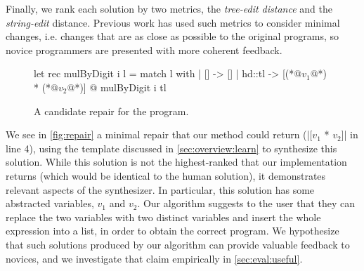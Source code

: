  Finally, we rank each solution by two metrics, the
\emph{tree-edit distance} and the \emph{string-edit} distance. Previous work
\citep{Lerner2007-dt, Wang_2018, Gulwani_2018} has used such metrics to consider
minimal changes, i.e. changes that are as close as possible to the original
programs, so novice programmers are presented with more coherent feedback.

\begin{figure}[ht]
  \begin{ecode}
  let rec mulByDigit i l =
    match l with
    | []     -> []
    | hd::tl -> [(*@$v_1$@*) * (*@$v_2$@*)] @ mulByDigit i tl
  \end{ecode}
  \caption{A candidate repair for the \mbd program.}
  \label{fig:repair}
  \end{figure}

 We see in \autoref{fig:repair} a minimal repair that our
method could return (|[$v_1$ * $v_2$]| in line 4), using the template discussed
in \autoref{sec:overview:learn} to synthesize this solution. While this solution
is not the highest-ranked that our implementation returns (which would be
identical to the human solution), it demonstrates relevant aspects of the
synthesizer. In particular, this solution has some abstracted variables, $v_1$
and $v_2$. Our algorithm suggests to the user that they can replace the two
variables with two distinct variables and insert the whole expression into a
list, in order to obtain the correct program. We hypothesize that such solutions
produced by our algorithm can provide valuable feedback to novices, and we
investigate that claim empirically in \autoref{sec:eval:useful}.
